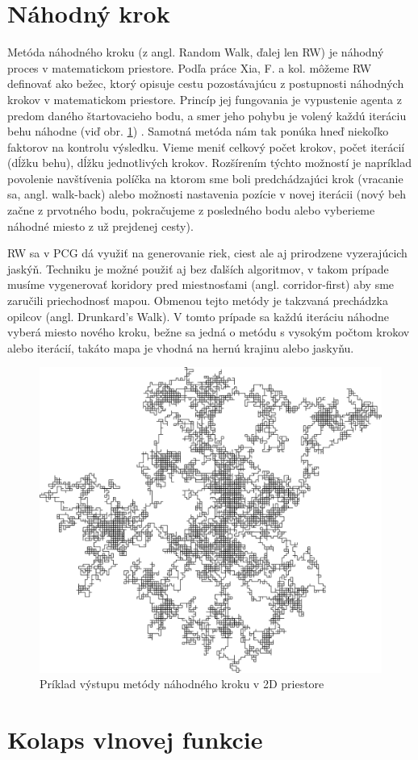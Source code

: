 \section{Náhodný krok} \label{random-walk}

Metóda náhodného kroku (z angl. Random Walk, ďalej len RW) je náhodný proces v matematickom priestore. Podľa práce Xia, F. a kol. môžeme RW definovať ako bežec, ktorý opisuje cestu pozostávajúcu z postupnosti náhodných krokov v matematickom priestore. Princíp jej fungovania je vypustenie agenta z predom daného štartovacieho bodu, a smer jeho pohybu je volený každú iteráciu behu náhodne (viď obr. \ref{fig:rw}) \cite{liangtian2020randomwalks}. 
Samotná metóda nám tak ponúka hneď niekoľko faktorov na kontrolu výsledku. Vieme meniť celkový počet krokov, počet iterácií (dĺžku behu), dĺžku jednotlivých krokov. Rozšírením týchto možností je napríklad povolenie navštívenia políčka na ktorom sme boli predchádzajúci krok (vracanie sa, angl. walk-back) alebo možnosti nastavenia pozície v novej iterácii (nový beh začne z prvotného bodu, pokračujeme z posledného bodu alebo vyberieme náhodné miesto z už prejdenej cesty).  

RW sa v PCG dá využiť na generovanie riek, ciest ale aj prirodzene vyzerajúcich jaskýň. Techniku je možné použiť aj bez ďalších algoritmov, v takom prípade musíme vygenerovať koridory pred miestnosťami (angl. corridor-first) aby sme zaručili priechodnosť mapou. Obmenou tejto metódy je takzvaná prechádzka opilcov (angl. Drunkard's Walk). V tomto prípade sa každú iteráciu náhodne vyberá miesto nového kroku, bežne sa jedná o metódu s vysokým počtom krokov alebo iterácií, takáto mapa je vhodná na hernú krajinu alebo jaskyňu.

\begin{figure}[H]
    \centering
    \includegraphics[width=0.35\linewidth]{obrazky-figures/dw-example.png}
    \caption{Príklad výstupu metódy náhodného kroku v 2D priestore}
    \label{fig:rw}
\end{figure}

\section{Kolaps vlnovej funkcie}

